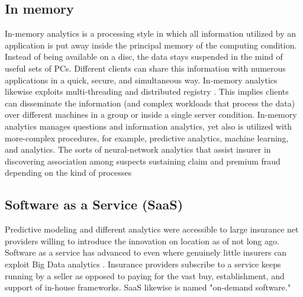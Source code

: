 \documentclass[sigconf]{acmart}
\begin{document}
\subsection{In memory}
In-memory analytics is a processing style in which all information utilized by an application is put away inside the principal memory of the computing condition. Instead of being available on a disc, the data stays suspended in the mind of useful sets of PCs. Different clients can share this information with numerous applications in a quick, secure, and simultaneous way. In-memory analytics likewise exploits multi-threading and distributed registry \cite{12,16}. This implies clients can disseminate the information (and complex workloads that process the data) over different machines in a group or inside a single server condition. In-memory analytics manages questions and information analytics, yet also is utilized with more-complex procedures, for example, predictive analytics, machine learning, and analytics. The sorts of neural-network analytics that assist insurer in discovering association among suspects sustaining claim and premium fraud depending on the kind of processes

\subsection{Software as a Service (SaaS)}
Predictive modeling and different analytics were accessible to large insurance net providers willing to introduce the innovation on location as of not long ago. Software as a service has advanced to even where genuinely little insurers can exploit Big Data analytics \cite{16}. Insurance providers subscribe to a service keeps running by a seller as opposed to paying for the vast buy, establishment, and support of in-house frameworks. SaaS likewise is named "on-demand software."
\end{document}
